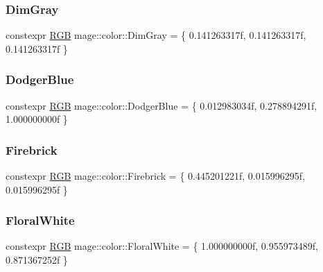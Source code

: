 \mbox{\label{namespacemage_1_1color_a74d9b984f9bc60a90b9d7eb6debce8ca}} 
\subsubsection{\texorpdfstring{Dim\+Gray}{DimGray}}
{\footnotesize\ttfamily constexpr \mbox{\hyperlink{structmage_1_1_r_g_b}{R\+GB}} mage\+::color\+::\+Dim\+Gray = \{ 0.\+141263317f, 0.\+141263317f, 0.\+141263317f \}}

\mbox{\label{namespacemage_1_1color_ad5375c3554ad1719cb3cb199ad0eb9ee}} 
\subsubsection{\texorpdfstring{Dodger\+Blue}{DodgerBlue}}
{\footnotesize\ttfamily constexpr \mbox{\hyperlink{structmage_1_1_r_g_b}{R\+GB}} mage\+::color\+::\+Dodger\+Blue = \{ 0.\+012983034f, 0.\+278894291f, 1.\+000000000f \}}

\mbox{\label{namespacemage_1_1color_add7b65bdb6d5f690222f8be205a5b028}} 
\subsubsection{\texorpdfstring{Firebrick}{Firebrick}}
{\footnotesize\ttfamily constexpr \mbox{\hyperlink{structmage_1_1_r_g_b}{R\+GB}} mage\+::color\+::\+Firebrick = \{ 0.\+445201221f, 0.\+015996295f, 0.\+015996295f \}}

\mbox{\label{namespacemage_1_1color_a1dd66768142140e9ee68a95e5981c44a}} 
\subsubsection{\texorpdfstring{Floral\+White}{FloralWhite}}
{\footnotesize\ttfamily constexpr \mbox{\hyperlink{structmage_1_1_r_g_b}{R\+GB}} mage\+::color\+::\+Floral\+White = \{ 1.\+000000000f, 0.\+955973489f, 0.\+871367252f \}}

